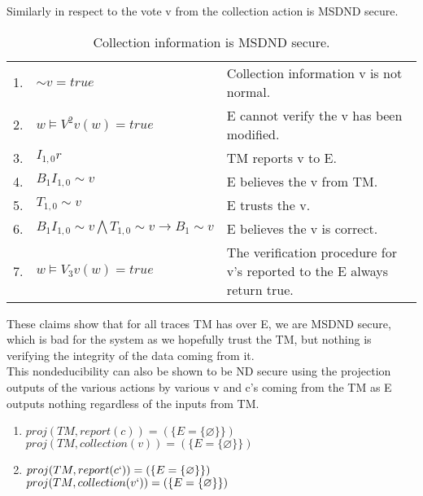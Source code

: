 \documentclass[journal,onecolumn]{IEEEtran}
\begin{document}
\begin{enumerate}
\begin{enumerate}
      Similarly in respect to the vote v from the collection action is MSDND secure. 

      \begin{table}[H]
        \caption{Collection information is MSDND secure.}
        \centering
        \begin{tabular}{lll}
        1.  & ${\sim} v = true$                                                 & Collection information v is not normal.                                                       \\
        2.  & $w \vDash V^2 v(w) = true$                                      & E cannot verify the v has been modified.                                 \\
        3.  & $I_{1,0}r$                                                        & TM reports v to E.                                                \\
        4.  & $B_1I_{1,0} {\sim} v$                                               & E believes the v from TM.                                     \\
        5.  & $T_{1,0} {\sim} v$                                                  & E trusts the v.                                                          \\
        6.  & $B_1I_{1,0} {\sim} v \bigwedge T_{1,0} {\sim} v \rightarrow B_1 {\sim} v$ & E believes the v is correct.                                             \\
        7. & $w \vDash V_3 v(w) = true$                                       & The verification procedure for v's reported to the E always return true.
        \end{tabular}
      \end{table}

      These claims show that for all traces TM has over E, we are MSDND secure, which is bad for the system as we hopefully trust the TM, but nothing is verifying the integrity of the data coming from it. \\

      This nondeducibility can also be shown to be ND secure using the projection outputs of the various actions by various v and c's coming from the TM as E outputs nothing regardless of the inputs from TM. \\

      \begin{enumerate}
        \item $proj(TM, report(c)) = (\{E = \{\varnothing\}\})$ \\
        $proj(TM, collection(v)) = (\{E = \{\varnothing\}\})$
        \item $proj(TM, report(c`)) = (\{E = \{\varnothing\}\})$ \\
        $proj(TM, collection(v`)) = (\{E = \{\varnothing\}\})$ \\
      \end{enumerate}


\end{enumerate}
\end{enumerate}
\end{document}
